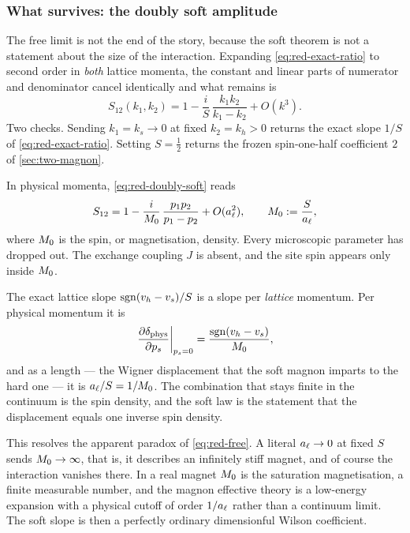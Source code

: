 \subsubsection*{What survives: the doubly soft amplitude}

The free limit is not the end of the story, because the soft theorem is not a
statement about the size of the interaction. Expanding
\eqref{eq:red-exact-ratio} to second order in \emph{both} lattice momenta, the
constant and linear parts of numerator and denominator cancel identically and
what remains is
\begin{equation}
  \boxed{\;
  S_{12}(k_1,k_2)=1-\frac{i}{S}\,\frac{k_1k_2}{k_1-k_2}+O(k^3).\;}
  \label{eq:red-doubly-soft}
\end{equation}
Two checks. Sending $k_1=k_s\to0$ at fixed $k_2=k_h>0$ returns the exact slope
$1/S$ of \eqref{eq:red-exact-ratio}. Setting $S=\tfrac12$ returns the frozen
spin-one-half coefficient $2$ of \cref{sec:two-magnon}.

In physical momenta, \eqref{eq:red-doubly-soft} reads
\begin{equation}
  S_{12}=1-\frac{i}{M_{0}}\,\frac{p_1p_2}{p_1-p_2}+O(a_{\ell}^2),
  \qquad
  M_{0}:=\frac{S}{a_{\ell}},
  \label{eq:red-doubly-soft-phys}
\end{equation}
where $M_{0}$ is the spin, or magnetisation, density. Every microscopic
parameter has dropped out. The exchange coupling $J$ is absent, and the site
spin appears only inside $M_{0}$.

\begin{observation}
\label{obs:slope-is-inverse-density}
The exact lattice slope $\operatorname{sgn}(v_h-v_s)/S$ is a slope per \emph{lattice}
momentum. Per physical momentum it is
\begin{equation}
  \left.\frac{\partial\delta_{\mathrm{phys}}}{\partial p_s}\right|_{p_s=0}
  =\frac{\operatorname{sgn}(v_h-v_s)}{M_{0}},
  \label{eq:red-slope-phys}
\end{equation}
and as a length --- the Wigner displacement that the soft magnon imparts to the
hard one --- it is $a_{\ell}/S=1/M_{0}$. The combination that stays finite
in the continuum is the spin density, and the soft law is the statement that the
displacement equals one inverse spin density.
\end{observation}

\noindent This resolves the apparent paradox of \eqref{eq:red-free}. A literal
$a_{\ell}\to0$ at fixed $S$ sends $M_{0}\to\infty$, that is, it describes an
infinitely stiff magnet, and of course the interaction vanishes there. In a real
magnet $M_{0}$ is the saturation magnetisation, a finite measurable number,
and the magnon effective theory is a low-energy expansion with a physical
cutoff of order $1/a_{\ell}$ rather than a continuum limit. The soft slope is
then a perfectly ordinary dimensionful Wilson coefficient.

